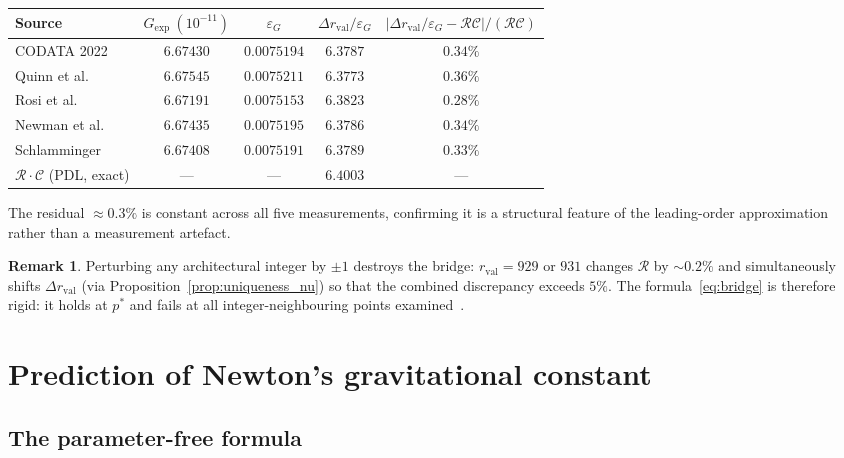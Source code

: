 \documentclass[11pt,a4paper]{article}
\theoremstyle{definition}
\newtheorem{remark}[theorem]{Remark}
\newcommand{\rval}{r_{\mathrm{val}}}
\newcommand{\epsg}{\varepsilon_G}
\newcommand{\calR}{\mathcal{R}}
\newcommand{\calC}{\mathcal{C}}
\newcommand{\drval}{\Delta r_{\mathrm{val}}}
\begin{document}
\begin{center}
\begin{tabular}{lcccc}
\toprule
Source
  & $G_{\mathrm{exp}}\ (10^{-11})$
  & $\epsg$
  & $\drval/\epsg$
  & $|\drval/\epsg - \calR\calC|/(\calR\calC)$ \\
\midrule
CODATA 2022           & $6.67430$ & $0.0075194$ & $6.3787$ & $0.34\%$ \\
Quinn et al.~\cite{Quinn_2013}   & $6.67545$ & $0.0075211$ & $6.3773$ & $0.36\%$ \\
Rosi et al.~\cite{Rosi_2014}     & $6.67191$ & $0.0075153$ & $6.3823$ & $0.28\%$ \\
Newman et al.~\cite{Newman_2014} & $6.67435$ & $0.0075195$ & $6.3786$ & $0.34\%$ \\
Schlamminger~\cite{Schlamminger_2015} & $6.67408$ & $0.0075191$ & $6.3789$ & $0.33\%$ \\
\midrule
$\calR\cdot\calC$ (PDL, exact) & --- & --- & $6.4003$ & --- \\
\bottomrule
\end{tabular}
\end{center}

The residual $\approx 0.3\%$ is constant across all five measurements, confirming it is a structural feature of the leading-order approximation rather than a measurement artefact.

\begin{remark}
  \label{rem:bridge_rigidity}
  Perturbing any architectural integer by $\pm 1$ destroys the bridge: $\rval = 929$ or $931$ changes $\calR$ by $\sim 0.2\%$ and simultaneously shifts $\drval$ (via Proposition~\ref{prop:uniqueness_nu}) so that the combined discrepancy exceeds $5\%$. The formula~\eqref{eq:bridge} is therefore rigid: it holds at $p^*$ and fails at all integer-neighbouring points examined~\cite{Bridge_Formula_PDL_2026}.
\end{remark}

\section{Prediction of Newton's gravitational constant}
\label{sec:G}

\subsection{The parameter-free formula}
\label{subsec:G_prediction}
\end{document}
